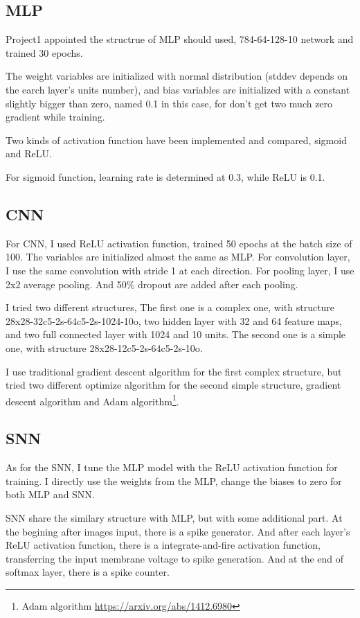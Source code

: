\documentclass[10pt,twocolumn,letterpaper]{article}
\begin{document}
\begin{CJK}{UTF8}{gbsn}
\subsection{MLP}

Project1 appointed the structrue of MLP should used, 784-64-128-10 network and trained 30 epochs. 

The weight variables are initialized with normal distribution (stddev depends on the earch layer's units number), and bias variables are initialized with a constant slightly bigger than zero, named 0.1 in this case, for don't get two much zero gradient while training.

Two kinds of activation function have been implemented and compared, sigmoid and ReLU.

For sigmoid function, learning rate is determined at 0.3, while ReLU is 0.1. 

\subsection{CNN}

For CNN, I used ReLU activation function, trained 50 epochs at the batch size of 100. The variables are initialized almost the same as MLP. For convolution layer, I use the same convolution with stride 1 at each direction. For pooling layer, I use 2x2 average pooling. And 50\% dropout are added after each pooling.

I tried two different structures, The first one is a complex one, with structure 28x28-32c5-2s-64c5-2s-1024-10o, two hidden layer with 32 and 64 feature maps, and two full connected layer with 1024 and 10 units. The second one is a simple one, with structure 28x28-12c5-2s-64c5-2s-10o.

I use traditional gradient descent algorithm for the first complex structure, but tried two different optimize algorithm for the second simple structure, gradient descent algorithm and Adam algorithm\footnote{Adam algorithm \url{https://arxiv.org/abs/1412.6980}}. 

\subsection{SNN}

As for the SNN, I tune the MLP model with the ReLU activation function for training. I directly use the weights from the MLP, change the biases to zero for both MLP and SNN. 

SNN share the similary structure with MLP, but with some additional part. At the begining after images input, there is a spike generator. And after each layer's ReLU activation function, there is a integrate-and-fire activation function, transferring the input membrane voltage to spike generation. And at the end of softmax layer, there is a spike counter.


\end{CJK}
\end{document}

